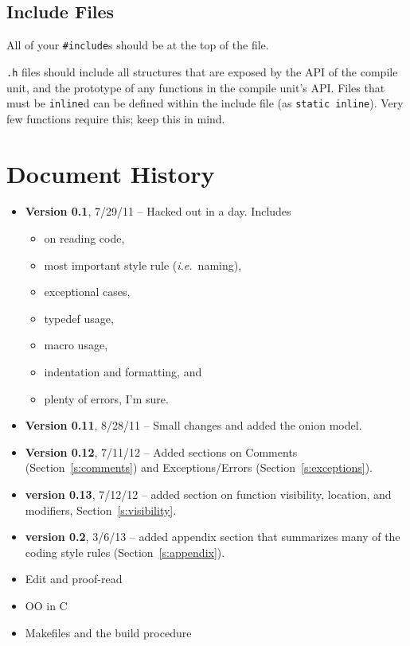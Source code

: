 \documentclass[11pt,onecolumn]{article}
\def\ie{\textit{i.e.}}
\newcommand{\head}[1]{\vspace{0.4em}\noindent{\bf #1}}
\newcommand{\lsthead}[1]{{\bf #1}}
\begin{document}
\subsection{Include Files}

All of your {\tt \#include}s should be at the top of the file.

{\tt .h} files should include all structures that are exposed by the
API of the compile unit, and the prototype of any functions in the
compile unit's API.  Files that must be {\tt inline}d can be defined
within the include file (as {\tt static inline}).  Very few functions
require this; keep this in mind.

\section{Document History}
\label{s:hist}

\begin{itemize}
\item \lsthead{Version 0.1}, 7/29/11 -- Hacked out in a day.  Includes
\begin{itemize}[itemsep=0pt,topsep=1pt,parsep=1pt,leftmargin=2.5em]
\item on reading code,
\item most important style rule (\ie\ naming),
\item exceptional cases,
\item typedef usage,
\item macro usage,
\item indentation and formatting, and
\item plenty of errors, I'm sure.
\end{itemize}
\item \lsthead{Version 0.11}, 8/28/11 -- Small changes and added the
  onion model.
\item \lsthead{Version 0.12}, 7/11/12 -- Added sections on Comments
  (Section~\ref{s:comments}) and Exceptions/Errors
  (Section~\ref{s:exceptions}).
\item \lsthead{version 0.13}, 7/12/12 -- added section on function
  visibility, location, and modifiers, Section~\ref{s:visibility}.
\item \lsthead{version 0.2}, 3/6/13 -- added appendix section that
  summarizes many of the coding style rules
  (Section~\ref{s:appendix}).
\end{itemize}

\head{TODO}
\begin{itemize}[itemsep=0pt,topsep=1pt,parsep=1pt,leftmargin=2.5em]
\item Edit and proof-read
\item OO in C
\item Makefiles and the build procedure
\end{itemize}
\end{document}

